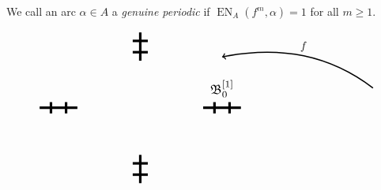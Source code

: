 \documentclass{amsart}
\newcommand{\ExpN}{{\operatorname{EN}}}
\newcommand{\bush}{{\mathfrak B }}
\newcommand{\1}{{\mathbb 1 }}
\begin{document}
 
We call an arc $\alpha\in A$ a \emph{genuine periodic} if $\ExpN_A(f^m,\alpha)=1$ for all $m\ge 1$.




\begin{figure}[t!]
\[\begin{tikzpicture}[xscale=2,yscale=1.5]


\begin{scope}[rotate =0,shift={(1.3,0)},scale=0.6]
\draw[line width=0.8mm] (-0.5,0)--(0.5,0); 
\draw[line width=0.8mm] (-0.2,-0.2)--(-0.2,0.2);
\draw[line width=0.8mm] (0.2,-0.2)--(0.2,0.2);

\coordinate (la1) at (-0.2,0.2);
\coordinate (la0) at (-0.2,-0.2);


\draw[line width=0.4mm] (4,0.7) edge[->,bend right]node[above]{$f$} (-0.,1.8);


\node[above,scale=1.2] at(0,0.2){$\bush^{[1]}_0$};

 \end{scope}
  
  \begin{scope}[rotate =90,shift={(1.3,0)}, scale=0.6]
\draw[line width=0.8mm] (-0.5,0)--(0.5,0); 
\draw[line width=0.8mm] (-0.2,-0.2)--(-0.2,0.2);
\draw[line width=0.8mm] (0.2,-0.2)--(0.2,0.2);

\coordinate (lb1) at (-0.2,0.2);
\coordinate (lb0) at (-0.2,-0.2);

\coordinate (lbb) at (-0.5,0);
  \end{scope}
  
   
 
   
  \begin{scope}[rotate =180,shift={(1.3,0)}, scale=0.6]
\draw[line width=0.8mm] (-0.5,0)--(0.5,0); 
\draw[line width=0.8mm] (-0.2,-0.2)--(-0.2,0.2);
\draw[line width=0.8mm] (0.2,-0.2)--(0.2,0.2);

\coordinate (lc1) at (-0.2,0.2);
\coordinate (lc0) at (-0.2,-0.2);
  \end{scope}
  
    \begin{scope}[rotate =270,shift={(1.3,0)}, scale=0.6]
\draw[line width=0.8mm] (-0.5,0)--(0.5,0); 
\draw[line width=0.8mm] (-0.2,-0.2)--(-0.2,0.2);
\draw[line width=0.8mm] (0.2,-0.2)--(0.2,0.2);

\coordinate (ld1) at (-0.2,0.2);
\coordinate (ld0) at (-0.2,-0.2);
\coordinate (ldd) at (-0.5,0);

  \end{scope}



\end{tikzpicture}\]
\end{figure}
\end{document}
